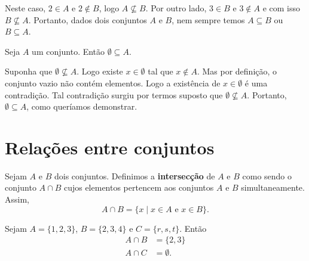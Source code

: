 Neste caso, $2 \in A$ e $2 \notin B$, logo $A \nsubseteq B$. Por outro lado, $3 \in B$ e $3 \notin A$ e com isso $B \nsubseteq A$. Portanto, dados dois conjuntos $A$ e $B$, nem sempre temos $A \subseteq B$ ou $B \subseteq A$.

\begin{proposicao}
    Seja $A$ um conjunto. Então $ \emptyset \subseteq A$.
\end{proposicao}
\begin{prova}
    Suponha que $\emptyset \nsubseteq A$. Logo existe $x \in \emptyset$ tal que $x \notin A$. Mas por definição, o conjunto vazio não contém elementos. Logo a existência de $x \in \emptyset$ é uma contradição. Tal contradição surgiu por termos suposto que $\emptyset \nsubseteq A$. Portanto, $\emptyset \subseteq A$, como queríamos demonstrar.
\end{prova}

\section{Relações entre conjuntos}

\begin{definicao}\label{intersecao_conjunto}
    Sejam $A$ e $B$ dois conjuntos. Definimos a \textbf{intersecção} de $A$ e $B$ como sendo o conjunto $A \cap B$ cujos elementos pertencem aos conjuntos $A$ e $B$ simultaneamente. Assim,
    \[
        A \cap B = \{x \mid x \in A\mbox{ e }  x \in B\}.
    \]

\end{definicao}

\begin{exemplo}
    Sejam $A = \{1, 2, 3\}$, $B = \{2, 3, 4\}$ e $C = \{r, s, t\}$. Então
    \begin{align*}
        A \cap B &= \{2, 3\}\\
        A \cap C &= \emptyset.
    \end{align*}
\end{exemplo}

